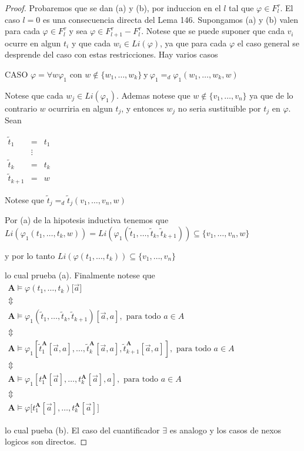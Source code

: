   \begin{proof}
    Probaremos que se dan (a) y (b), por induccion en el $l$ tal que $\varphi \in F_{l}^{\tau }.$ El caso $l=0$ es una consecuencia directa del Lema 146. Supongamos (a) y (b) valen para cada $\varphi \in F_{l}^{\tau } $ y sea $\varphi \in F_{l+1}^{\tau }-F_{l}^{\tau }.$ Notese que se puede suponer que cada $v_{i}$ ocurre en algun $t_{i}$ y que cada $w_{i}\in Li(\varphi )$, ya que para cada $\varphi $ el caso general se desprende del caso con estas restricciones. Hay varios casos

    CASO $\varphi =\forall w\varphi_{1}$ con $w\not\in \{w_{1}, \dotsc, w_{k}\} \ \text{y} \  \varphi_{1}=_{d}\varphi_{1}(w_{1}, \dotsc, w_{k},w)$

    Notese que cada $w_{j}\in Li(\varphi_{1})$. Ademas notese que $ w\not\in \{v_{1}, \dotsc, v_{n}\}$ ya que de lo contrario $w$ ocurriria en algun $ t_{j}$, y entonces $w_{j}$ no seria sustituible por $t_{j}$ en $\varphi $. Sean

    $\displaystyle \begin{array}{ccc} \tilde{t}_{1} & = & t_{1} \\ & \vdots & \\ \tilde{t}_{k} & = & t_{k} \\ \tilde{t}_{k+1} & = & w \end{array} $

    Notese que
    $\displaystyle \tilde{t}_{j}=_{d}\tilde{t}_{j}(v_{1}, \dotsc, v_{n},w) $

    Por (a) de la hipotesis inductiva tenemos que
    $\displaystyle Li(\varphi_{1}(t_{1}, \dotsc, t_{k},w))=Li(\varphi_{1}(\tilde{t}_{1}, \dotsc, \tilde{ t}_{k},\tilde{t}_{k+1}))\subseteq \{v_{1}, \dotsc, v_{n},w\} $

    y por lo tanto
    $\displaystyle Li(\varphi(t_{1}, \dotsc, t_{k}))\subseteq \{v_{1}, \dotsc, v_{n}\} $

    lo cual prueba (a). Finalmente notese que
    $\displaystyle \begin{array}{c} \mathbf{A} \models \varphi(t_{1}, \dotsc, t_{k})\mathbf{[}\vec{a}] \\ \Updownarrow \\ \mathbf{A} \models \varphi_{1}(\tilde{t}_{1}, \dotsc, \tilde{t}_{k},\tilde{t} _{k+1})[\vec{a},a],\text{ para todo }a\in A \\ \Updownarrow \\ \mathbf{A} \models \varphi_{1}[\tilde{t}_{1}^{\mathbf{A}}[\vec{a},a], \dotsc,  \tilde{t}_{k}^{\mathbf{A}}[\vec{a},a],\tilde{t}_{k+1}^{\mathbf{A}}[\vec{a} ,a]],\text{ para todo }a\in A \\ \Updownarrow \\ \mathbf{A} \models \varphi_{1}[t_{1}^{\mathbf{A}}[\vec{a}], \dotsc, t_{k}^{ \mathbf{A}}[\vec{a}],a],\text{ para todo }a\in A \\ \Updownarrow \\ \mathbf{A} \models \varphi \lbrack t_{1}^{\mathbf{A}}[\vec{a}], \dotsc, t_{k}^{ \mathbf{A}}[\vec{a}]] \end{array} $

    lo cual pueba (b). El caso del cuantificador $\exists $ es analogo y los casos de nexos logicos son directos.
  \end{proof}
